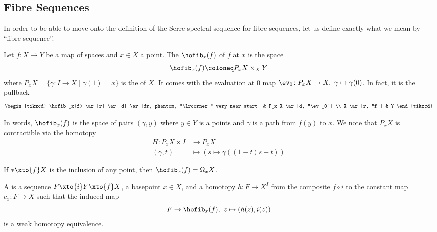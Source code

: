 \subsection{Fibre Sequences}
In order to be able to move onto the definition of the Serre spectral sequence for fibre sequences, let us define exactly what we mean by \enquote{fibre sequence}.
\begin{definition}
	Let $f\colon X \to Y$ be a map of spaces and $x \in X$ a point.
	The  $\hofib_x(f)$ of $f$ at $x$ is the space
	\begin{equation*}
		\hofib_x(f) \coloneq P_x X \times_X Y
	\end{equation*}
	where $P_x X = \{\gamma\colon I \to X \mid \gamma(1) = x\}$ is the  of $X$.
	It comes with the evaluation at 0 map $\ev_0\colon P_x X \to X,\ \gamma \mapsto \gamma(0)$.
	In fact, it is the pullback
	\begin{equation*}
		\begin{tikzcd}
			\hofib_x(f)
					\ar[r]
					\ar[d]
					\ar[dr, phantom, "\lrcorner" very near start]
				& P_x X
					\ar[d, "\ev_0"]
			\\
			X 
					\ar[r, "f"]
				& Y
		\end{tikzcd}
	\end{equation*}
\end{definition}
In words, $\hofib_x(f)$ is the space of pairs $(\gamma, y)$ where $y \in Y$ is a points and $\gamma$ is a path from $f(y)$ to $x$.
We note that $P_x X$ is contractible via the homotopy
\begin{align*}
	H\colon P_x X \times I &\to P_x X \\
	(\gamma, t) &\mapsto (s \mapsto \gamma((1 - t)s + t))
\end{align*}
\begin{example}
	If $* \xto{f} X$ is the inclusion of any point, then $\hofib_x(f) = \Omega_x X$.
\end{example}
\begin{definition}
	A  is a sequence $F \xto{i} Y \xto{f} X$, a basepoint $x \in X$, and a homotopy $h\colon F \to X^I$ from the composite $f \circ i$ to the constant map $c_x\colon F \to X$ such that the induced map
	\begin{equation*}
		F \to \hofib_x(f),\ z \mapsto (h(z), i(z))
	\end{equation*}
	is a weak homotopy equivalence.
\end{definition}
